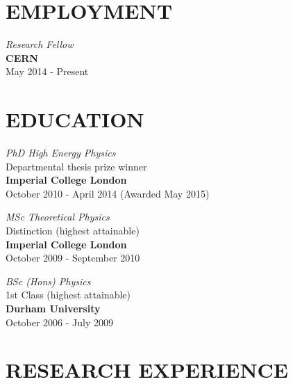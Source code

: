 \documentclass[margin, 10pt]{res} %
\begin{document}
\begin{resume}
\section{EMPLOYMENT}
{\sl Research Fellow} \\
{\bf CERN} \\
May 2014 - Present


\section{EDUCATION}

{\sl PhD High Energy Physics} \\
Departmental thesis prize winner \\
{\bf Imperial College London} \\
October 2010 - April 2014 (Awarded May 2015)

{\sl MSc Theoretical Physics} \\ %
Distinction (highest attainable) \\ %
{\bf Imperial College London} \\
October 2009 - September 2010

{\sl BSc (Hons) Physics} \\ %
1st Class (highest attainable) \\ %
{\bf Durham University} \\
October 2006 - July 2009

\section{RESEARCH EXPERIENCE}


\end{resume}
\end{document}
